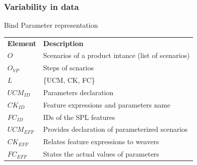 \documentclass[xcolor=svgnames]{beamer}
\begin{document}
\begin{frame}
\frametitle{Variability in data}
\begin{block}{Bind Parameter representation}
\begin{scriptsize}
\begin{tabular}{p{0.6in}p{2.4in}}
   \hline\noalign{\smallskip}
  {\bf Element} & {\bf Description} \\
   \noalign{\smallskip}
   \hline
   \noalign{\smallskip}
   $O$             	& Scenarios of a product intance (list of scenarios) \\ 
   $O_{VP}$        	& Steps of scnarios \\ 
   $L$             	& \{UCM, CK, FC\} \\ 
   $UCM_{ID}$ 	   	& Parameters declaration \\ 
   $CK_{ID}$    	& Feature expressions and parameters name\\  
   $FC_{ID}$    	& IDs of the SPL features \\ 
   $UCM_{EFF}$ 		& Provides declaration of parameterized scenarios \\  
   $CK_{EFF}$    	& Relates feature expressions to weavers \\ 
   $FC_{EFF}$    	& States the actual values of parameters \\
   \hline
  \end{tabular}
\end{scriptsize}
\end{block}
\end{frame}
\end{document}
